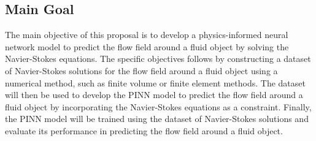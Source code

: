 \subsection{Main Goal}
The main objective of this proposal is to develop a physics-informed neural network model to predict the flow field around a fluid object by solving the Navier-Stokes equations. The specific objectives follows by constructing a dataset of Navier-Stokes solutions for the flow field around a fluid object using a numerical method, such as finite volume or finite element methods. The dataset will then be used to develop the PINN model to predict the flow field around a fluid object by incorporating the Navier-Stokes equations as a constraint. Finally, the PINN model will be trained using the dataset of Navier-Stokes solutions and evaluate its performance in predicting the flow field around a fluid object.


